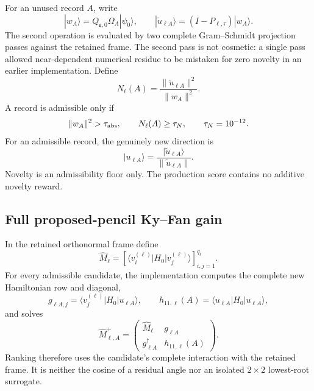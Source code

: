 \documentclass[
  reprint,
  amsmath,
  amssymb,
  aps,
  pra,
  nofootinbib,
  superscriptaddress,
  floatfix
]{revtex4-2}
\newcommand{\ket}[1]{|#1\rangle}
\newcommand{\bra}[1]{\langle #1|}
\begin{document}
For an unused record $A$, write
\begin{equation}
 \ket{w_A}=Q_{\mathfrak s,0}\Omega_A\ket{\psi_0},
 \qquad
 \ket{\widetilde u_{\ell A}}=(I-P_{\ell,\tau})\ket{w_A}.
 \label{eq:candidate_residualization}
\end{equation}
The second operation is evaluated by two complete Gram--Schmidt projection
passes against the retained frame.  The second pass is not cosmetic: a
single pass allowed near-dependent numerical residue to be mistaken for zero
novelty in an earlier implementation.  Define
\begin{equation}
 N_\ell(A)=
 \frac{\|\widetilde u_{\ell A}\|^2}{\|w_A\|^2}.
 \label{eq:novelty_fraction}
\end{equation}
A record is admissible only if
\begin{equation}
 \|w_A\|^2>\tau_{\rm abs},
 \qquad N_\ell(A)\geq\tau_N,
 \qquad \tau_N=10^{-12}.
 \label{eq:candidate_admissibility}
\end{equation}
For an admissible record, the genuinely new direction is
\begin{equation}
 \ket{u_{\ell A}}=
 \frac{\ket{\widetilde u_{\ell A}}}{\|\widetilde u_{\ell A}\|}.
 \label{eq:normalized_novel_direction}
\end{equation}
Novelty is an admissibility floor only.  The production score contains no
additive novelty reward.

\subsection{Full proposed-pencil Ky--Fan gain}
\label{sec:full_pencil_gain}

In the retained orthonormal frame define
\begin{equation}
 \widehat M_\ell=
 \left[\bra{v_i^{(\ell)}}H_0\ket{v_j^{(\ell)}}\right]_{i,j=1}^{q_\ell}.
 \label{eq:retained_hamiltonian}
\end{equation}
For every admissible candidate, the implementation computes the complete new
Hamiltonian row and diagonal,
\begin{equation}
 g_{\ell A,j}=\bra{v_j^{(\ell)}}H_0\ket{u_{\ell A}},
 \qquad
 h_{11,\ell}(A)=\bra{u_{\ell A}}H_0\ket{u_{\ell A}},
 \label{eq:candidate_hamiltonian_row}
\end{equation}
and solves
\begin{equation}
 \widehat M_{\ell,A}^{+}=
 \begin{pmatrix}
   \widehat M_\ell & g_{\ell A}\\
   g_{\ell A}^{\dagger} & h_{11,\ell}(A)
 \end{pmatrix}.
 \label{eq:full_proposed_pencil}
\end{equation}
Ranking therefore uses the candidate's complete interaction with the
retained frame.  It is neither the cosine of a residual angle nor an isolated
$2\times2$ lowest-root surrogate.
\end{document}

